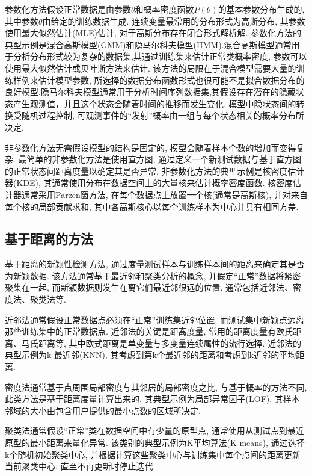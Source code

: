\documentclass{Style/aas}
\begin{document}
\begin{multicols}{2}
  参数化方法假设正常数据是由参数$\theta$和概率密度函数$P\left( \theta \right) $的基本参数分布生成的, 其中参数$\theta$由给定的训练数据生成. 连续变量最常用的分布形式为高斯分布, 其参数使用最大似然估计(MLE)估计, 对于高斯分布存在闭合形式解析解. 参数化方法的典型示例是混合高斯模型(GMM)\cite{reynolds2009gaussian}和隐马尔科夫模型(HMM).混合高斯模型通常用于分析分布形式较为复杂的数据集,其通过训练集来估计正常类概率密度, 参数可以使用最大似然估计或贝叶斯方法来估计. 该方法的局限在于混合模型需要大量的训练样例来估计模型参数, 所选择的数据分布函数形式也很可能不是拟合数据分布的良好模型.隐马尔科夫模型通常用于分析时间序列数据集,其假设存在潜在的隐藏状态产生观测值，并且这个状态会随着时间的推移而发生变化. 模型中隐状态间的转换受随机过程控制, 可观测事件的“发射”概率由一组与每个状态相关的概率分布所决定.

  非参数化方法无需假设模型的结构是固定的, 模型会随着样本个数的增加而变得复杂. 最简单的非参数化方法是使用直方图, 通过定义一个新测试数据与基于直方图的正常状态间距离度量以确定其是否异常. 非参数化方法的典型示例是核密度估计器(KDE)\cite{bishop2006pattern}, 其通常使用分布在数据空间上的大量核来估计概率密度函数. 核密度估计器通常采用Parzen窗方法\cite{janakiram2006outlier}, 在每个数据点上放置一个核(通常是高斯核), 并对来自每个核的局部贡献求和, 其中各高斯核心以每个训练样本为中心并具有相同方差.

  \subsection{基于距离的方法}
  基于距离的新颖性检测方法, 通过度量测试样本与训练样本间的距离来确定其是否为新颖数据. 该方法通常基于最近邻和聚类分析的概念, 并假定“正常”数据将紧密聚集在一起, 而新颖数据则发生在离它们最近邻很远的位置. 通常包括近邻法、密度法、聚类法等.

  近邻法通常假设正常数据点必须在“正常”训练集近邻位置, 而测试集中新颖点远离那些训练集中的正常数据点. 近邻法的关键是距离度量, 常用的距离度量有欧氏距离、马氏距离等, 其中欧式距离是单变量与多变量连续属性的流行选择. 近邻法的典型示例为k-最近邻(KNN)\cite{peterson2009k}, 其考虑到第k个最近邻的距离和考虑到k近邻的平均距离.

  密度法通常基于点周围局部密度与其邻居的局部密度之比, 与基于概率的方法不同, 此类方法是基于距离度量计算出来的. 其典型示例为局部异常因子(LOF)\cite{breunig2000lof}, 其样本邻域的大小由包含用户提供的最小点数的区域所决定.

  聚类法通常假设“正常”类在数据空间中有少量的原型点, 通常使用从测试点到最近原型的最小距离来量化异常. 该类别的典型示例为K平均算法(K-means)\cite{lee2008line}, 通过选择k个随机初始聚类中心, 并根据计算这些聚类中心与训练集中每个点间的距离更新当前聚类中心, 直至不再更新时停止迭代.



\end{multicols}
\end{document}
